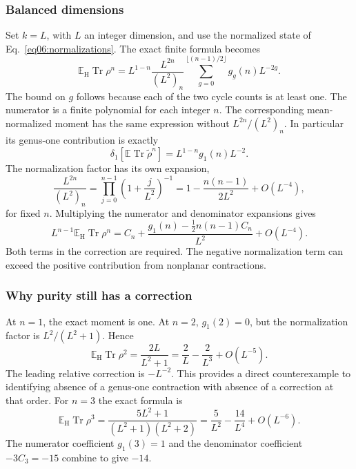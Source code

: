 \documentclass[11pt,letterpaper]{article}
\theoremstyle{plain}
\theoremstyle{definition}
\theoremstyle{remark}
\begin{document}
\subsubsection{Balanced dimensions}
Set $k=L$, with $L$ an integer dimension, and use the normalized state of
Eq.~\eqref{eq06:normalizations}.  The exact finite formula becomes
\begin{equation}
 \mathbb E_{\mathrm H}\operatorname{Tr}\rho^n
 =L^{1-n}\frac{L^{2n}}{(L^2)_n}
 \sum_{g=0}^{\lfloor(n-1)/2\rfloor}g_g(n)L^{-2g}.
 \label{eq10:moment_genus_expansion}
\end{equation}
The bound on $g$ follows because each of the two cycle counts is at least
one.  The numerator is a finite polynomial for each integer $n$.
The corresponding mean-normalized moment has the same expression without
$L^{2n}/(L^2)_n$.  In particular its genus-one contribution is exactly
\begin{equation}
 \delta_1\!\left[\mathbb E\operatorname{Tr}\widetilde\rho^n\right]
 =L^{1-n}g_1(n)L^{-2}.
 \label{eq10:genus_one_contribution}
\end{equation}
The normalization factor has its own expansion,
\begin{equation}
 \frac{L^{2n}}{(L^2)_n}
 =\prod_{j=0}^{n-1}\left(1+\frac{j}{L^2}\right)^{-1}
 =1-\frac{n(n-1)}{2L^2}+O(L^{-4}),
 \label{eq10:normalization_expansion}
\end{equation}
for fixed $n$.  Multiplying the numerator and denominator expansions gives
\begin{equation}
 L^{n-1}\mathbb E_{\mathrm H}\operatorname{Tr}\rho^n
 =C_n+\frac{g_1(n)-\tfrac12n(n-1)C_n}{L^2}
 +O(L^{-4}).
 \label{eq10:normalized_first_correction}
\end{equation}
Both terms in the correction are required.  The negative normalization term
can exceed the positive contribution from nonplanar contractions.

\subsubsection{Why purity still has a correction}
\label{subsubsec10:vanishing}
At $n=1$, the exact moment is one.  At $n=2$, $g_1(2)=0$, but the
normalization factor is $L^2/(L^2+1)$.  Hence
\begin{equation}
 \mathbb E_{\mathrm H}\operatorname{Tr}\rho^2
 =\frac{2L}{L^2+1}
 =\frac2L-\frac2{L^3}+O(L^{-5}).
 \label{eq10:purity_correction}
\end{equation}
The leading relative correction is $-L^{-2}$.  This provides a direct
counterexample to identifying absence of a genus-one contraction with absence
of a correction at that order.  For $n=3$ the exact formula is
\begin{equation}
 \mathbb E_{\mathrm H}\operatorname{Tr}\rho^3
 =\frac{5L^2+1}{(L^2+1)(L^2+2)}
 =\frac5{L^2}-\frac{14}{L^4}+O(L^{-6}).
 \label{eq10:third_moment}
\end{equation}
The numerator coefficient $g_1(3)=1$ and the denominator coefficient
$-3C_3=-15$ combine to give $-14$.
\end{document}
